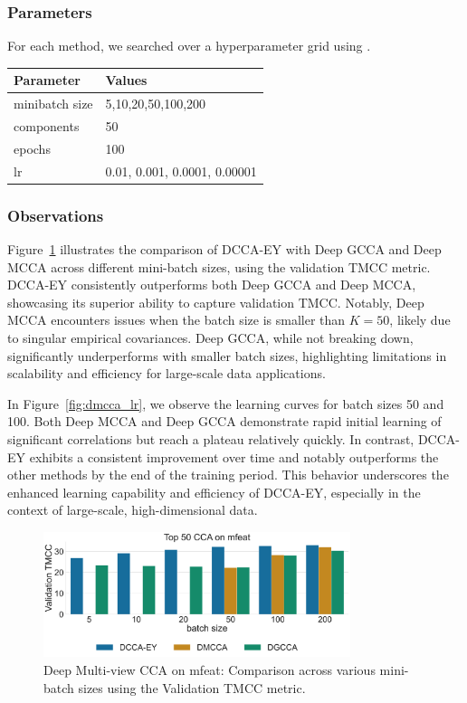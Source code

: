 \subsubsection{Parameters} For each method, we searched over a hyperparameter grid using \citet{wandb}.

\begin{table}[h!]
    \centering
    \begin{tabular}{|l|l|}
        \hline Parameter      & Values                       \\
        \hline minibatch size & 5,10,20,50,100,200           \\
        \hline components     & 50                           \\
        \hline epochs         & 100                          \\
        \hline lr             & 0.01, 0.001, 0.0001, 0.00001 \\
        \hline
    \end{tabular}
\end{table}

\subsubsection{Observations}
Figure~\ref{fig:dmcca_corr} illustrates the comparison of DCCA-EY with Deep GCCA and Deep MCCA across different mini-batch sizes, using the validation TMCC metric.
DCCA-EY consistently outperforms both Deep GCCA and Deep MCCA, showcasing its superior ability to capture validation TMCC. Notably, Deep MCCA encounters issues when the batch size is smaller than $K=50$, likely due to singular empirical covariances.
Deep GCCA, while not breaking down, significantly underperforms with smaller batch sizes, highlighting limitations in scalability and efficiency for large-scale data applications.

In Figure~\ref{fig:dmcca_lr}, we observe the learning curves for batch sizes 50 and 100. Both Deep MCCA and Deep GCCA demonstrate rapid initial learning of significant correlations but reach a plateau relatively quickly. In contrast, DCCA-EY exhibits a consistent improvement over time and notably outperforms the other methods by the end of the training period. This behavior underscores the enhanced learning capability and efficiency of DCCA-EY, especially in the context of large-scale, high-dimensional data.

\begin{figure}
    \centering
    \includegraphics[width=0.8\textwidth]{figures/DMCCA/mfeat_models_different_batch_sizes}
    \caption{Deep Multi-view CCA on mfeat: Comparison across various mini-batch sizes using the Validation TMCC metric.}\label{fig:dmcca_corr}
\end{figure}

